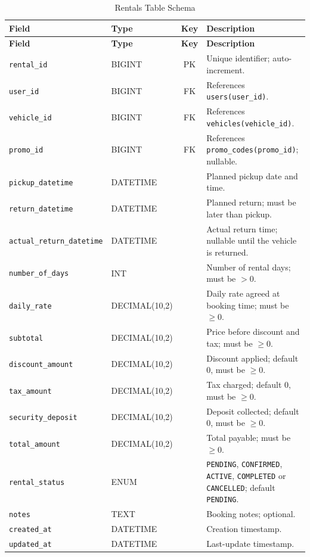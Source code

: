 \documentclass[10pt,a4paper]{report}
\newcommand{\col}[1]{\texttt{#1}}
\begin{document}
{\begin{longtable}{@{}llc>{\raggedright\arraybackslash}p{6.6cm}@{}}
\caption{Rentals Table Schema}\label{tab:rentals}\\
\toprule \textbf{Field} & \textbf{Type} & \textbf{Key} & \textbf{Description}\\ \midrule \endfirsthead
\toprule \textbf{Field} & \textbf{Type} & \textbf{Key} & \textbf{Description}\\ \midrule \endhead
\bottomrule \endfoot
\col{rental_id} & BIGINT & PK & Unique identifier; auto-increment.\\
\col{user_id} & BIGINT & FK & References \col{users(user_id)}.\\
\col{vehicle_id} & BIGINT & FK & References \col{vehicles(vehicle_id)}.\\
\col{promo_id} & BIGINT & FK & References \col{promo_codes(promo_id)}; nullable.\\
\col{pickup_datetime} & DATETIME & & Planned pickup date and time.\\
\col{return_datetime} & DATETIME & & Planned return; must be later than pickup.\\
\col{actual_return_datetime} & DATETIME & & Actual return time; nullable until the vehicle is returned.\\
\col{number_of_days} & INT & & Number of rental days; must be $> 0$.\\
\col{daily_rate} & DECIMAL(10,2) & & Daily rate agreed at booking time; must be $\geq 0$.\\
\col{subtotal} & DECIMAL(10,2) & & Price before discount and tax; must be $\geq 0$.\\
\col{discount_amount} & DECIMAL(10,2) & & Discount applied; default 0, must be $\geq 0$.\\
\col{tax_amount} & DECIMAL(10,2) & & Tax charged; default 0, must be $\geq 0$.\\
\col{security_deposit} & DECIMAL(10,2) & & Deposit collected; default 0, must be $\geq 0$.\\
\col{total_amount} & DECIMAL(10,2) & & Total payable; must be $\geq 0$.\\
\col{rental_status} & ENUM & & \col{PENDING}, \col{CONFIRMED}, \col{ACTIVE}, \col{COMPLETED} or \col{CANCELLED}; default \col{PENDING}.\\
\col{notes} & TEXT & & Booking notes; optional.\\
\col{created_at} & DATETIME & & Creation timestamp.\\
\col{updated_at} & DATETIME & & Last-update timestamp.\\
\end{longtable}

}
\end{document}
